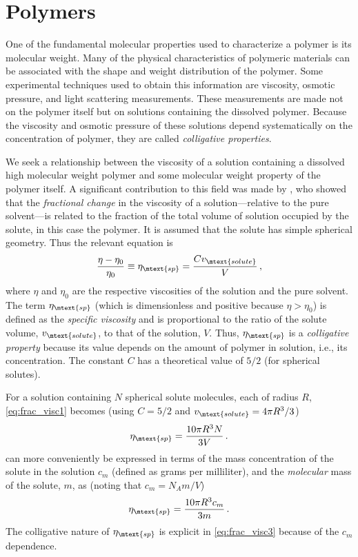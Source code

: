 \documentclass[nobib,nofonts,nols,nohyper]{tufte-handout}
\begin{document}

\section{Polymers} %
\label{sec:polymers}

One of the fundamental molecular properties used to characterize a polymer is its molecular weight. Many of the physical characteristics of polymeric materials can be associated with the shape and weight distribution of the polymer. Some experimental techniques used to obtain this information are viscosity, osmotic pressure, and light scattering measurements. These measurements are made not on the polymer itself but on solutions containing the dissolved polymer. Because the viscosity and osmotic pressure of these solutions depend systematically on the concentration of polymer, they are called \emph{colligative properties}. 

We seek a relationship between the viscosity of a solution containing a dissolved high molecular weight polymer and some molecular weight property of the polymer itself. 
A significant contribution to this field was made by \textcite{einstein06}, who showed that the \emph{fractional change} in the viscosity of a solution---relative to the pure solvent---is related to the fraction of the total volume of solution occupied by the solute, in this case the polymer. 
It is assumed that the solute has simple spherical geometry. 
Thus the relevant equation is
\begin{equation}
	\frac{\eta - \eta_0}{\eta_0} \equiv \eta_\mtext{sp} = \frac{C v_\mtext{solute}}{V} \, ,
	\label{eq:frac_visc1}
\end{equation}
where \( \eta \) and \( \eta_0 \) are the respective viscosities of the solution and the pure solvent. 
The term \( \eta_\mtext{sp} \) (which is dimensionless and positive because \( \eta > \eta_0 \)) is defined as the \emph{specific viscosity} and is proportional to the ratio of the solute volume, \( v_\mtext{solute} \), to that of the solution, \( V \). 
Thus, \( \eta_\mtext{sp} \) is a \emph{colligative property} because its value depends on the amount of polymer in solution, i.e., its concentration. 
The constant \( C \) has a theoretical value of \( 5/2 \) (for spherical solutes). 

For a solution containing \( N \) spherical solute molecules, each of radius \( R \), \cref{eq:frac_visc1} becomes (using \( C = 5/2 \) and \( v_\mtext{solute} = 4 \pi R^3 / 3 \))
\begin{equation}
	\eta_\mtext{sp} = \frac{10 \pi R^3 N}{3 V} \, .
	\label{eq:frac_visc2}
\end{equation}
 can more conveniently be expressed in terms of the mass concentration of the solute in the solution \( c_m \) (defined as grams per milliliter), and the \emph{molecular} mass of the solute, \( m \), as (noting that \( c_m = N_A m / V \))
\begin{equation}
	\eta_\mtext{sp} = \frac{10 \pi R^3 c_m}{3 m} \, .
	\label{eq:frac_visc3}
\end{equation}
The colligative nature of \( \eta_\mtext{sp} \) is explicit in \cref{eq:frac_visc3} because of the \( c_m \) dependence. 
\end{document}
